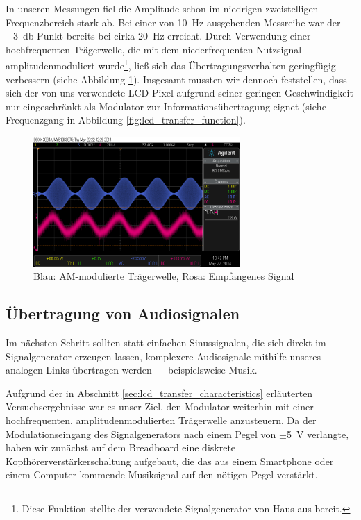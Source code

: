 \documentclass[12pt,a4paper]{article}
\begin{document}
In unseren Messungen fiel die Amplitude schon im niedrigen zweistelligen Frequenzbereich stark ab. Bei einer von \SI{10}{\hertz} ausgehenden Messreihe war der \SI{-3}{\decibel}-Punkt bereits bei cirka \SI{20}{\hertz} erreicht. Durch Verwendung einer hochfrequenten Trägerwelle, die mit dem niederfrequenten Nutzsignal amplitudenmoduliert wurde\footnote{Diese Funktion stellte der verwendete Signalgenerator von Haus aus bereit.}, ließ sich das Übertragungsverhalten geringfügig verbessern (siehe Abbildung \ref{fig:amplitude_modulation}). Insgesamt mussten wir dennoch feststellen, dass sich der von uns verwendete LCD-Pixel aufgrund seiner geringen Geschwindigkeit nur eingeschränkt als Modulator zur Informationsübertragung eignet (siehe Frequenzgang in Abbildung \ref{fig:lcd_transfer_function}).

\begin{figure}[H]
  \centering
    \includegraphics[width=0.7\textwidth]{../measurements/20140522_sweep/scope_1.png}
  \caption{Blau: AM-modulierte Trägerwelle, Rosa: Empfangenes Signal}
  \label{fig:amplitude_modulation}
\end{figure}


\subsection{Übertragung von Audiosignalen}

Im nächsten Schritt sollten statt einfachen Sinussignalen, die sich direkt im Signalgenerator erzeugen lassen, komplexere Audiosignale mithilfe unseres analogen Links übertragen werden --- beispielsweise Musik.

Aufgrund der in Abschnitt \ref{sec:lcd_transfer_characteristics} erläuterten Versuchsergebnisse war es unser Ziel, den Modulator weiterhin mit einer hochfrequenten, amplitudenmodulierten Trägerwelle anzusteuern. Da der Modulationseingang des Signalgenerators nach einem Pegel von $\pm$\SI{5}{\volt} verlangte, haben wir zunächst auf dem Breadboard eine diskrete Kopfhörerverstärkerschaltung aufgebaut, die das aus einem Smartphone oder einem Computer kommende Musiksignal auf den nötigen Pegel verstärkt.
\end{document}
